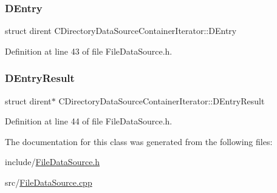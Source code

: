\hypertarget{classCDirectoryDataSourceContainerIterator_a69dfb8a9f2ab7f71e7d106d4d6c0e29b}{}\label{classCDirectoryDataSourceContainerIterator_a69dfb8a9f2ab7f71e7d106d4d6c0e29b} 
\subsubsection{\texorpdfstring{D\+Entry}{DEntry}}
{\footnotesize\ttfamily struct dirent C\+Directory\+Data\+Source\+Container\+Iterator\+::\+D\+Entry\hspace{0.3cm}{\ttfamily [protected]}}



Definition at line 43 of file File\+Data\+Source.\+h.

\hypertarget{classCDirectoryDataSourceContainerIterator_a7e8c1c50ef09013ee6013dcbd1bdc616}{}\label{classCDirectoryDataSourceContainerIterator_a7e8c1c50ef09013ee6013dcbd1bdc616} 
\subsubsection{\texorpdfstring{D\+Entry\+Result}{DEntryResult}}
{\footnotesize\ttfamily struct dirent$\ast$ C\+Directory\+Data\+Source\+Container\+Iterator\+::\+D\+Entry\+Result\hspace{0.3cm}{\ttfamily [protected]}}



Definition at line 44 of file File\+Data\+Source.\+h.



The documentation for this class was generated from the following files\+:\begin{DoxyCompactItemize}
\item 
include/\hyperlink{FileDataSource_8h}{File\+Data\+Source.\+h}\item 
src/\hyperlink{FileDataSource_8cpp}{File\+Data\+Source.\+cpp}\end{DoxyCompactItemize}

